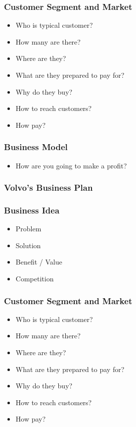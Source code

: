 \documentclass[conference]{IEEEtran}
\begin{document}
\subsubsection{Customer Segment and Market}
\begin{itemize}
	\item Who is typical customer?
	\item How many are there?
	\item Where are they?
	\item  What are they prepared to pay for?
	\item Why do they buy?
	\item How to reach customers?
	\item How pay?
\end{itemize}
\subsubsection{Business Model}
\begin{itemize}
	\item How are you going to make a profit?
\end{itemize}
\subsubsection{Volvo's Business Plan}
\subsubsection{Business Idea}
\begin{itemize}
	\item Problem
	\item Solution
	\item Benefit / Value
	\item Competition
\end{itemize}
\subsubsection{Customer Segment and Market}
\begin{itemize}
	\item Who is typical customer?
	\item How many are there?
	\item Where are they?
	\item  What are they prepared to pay for?
	\item Why do they buy?
	\item How to reach customers?
	\item How pay?
\end{itemize}
\end{document}
